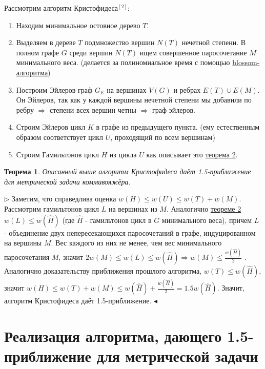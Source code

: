 \documentclass[A4, twocolumn]{article}
\newtheorem{Th}{Теорема}
\newenvironment{PROOF}
{\par\noindent{\bf Доказательство:}\newline$\triangleright$}
{\hfill$\scriptstyle\blacktriangleleft$}
\begin{document}
Рассмотрим алгоритм Кристофидеса\hyperref[algoChrist]{$^{[2]}$}:

\begin{enumerate}
	\item Находим минимальное остовное дерево $T$.
	\item Выделяем в дереве $T$ подмножество вершин $N(T)$ нечетной степени. В полном графе $G$ среди вершин $N(T)$ ищем совершенное паросочетание $M$ минимального веса. (делается за полиномиальное время с помощью \hyperref[kolm]{blossom-алгоритма})
	\item Построим Эйлеров граф $G_E$ на вершинах $V(G)$ и ребрах $E(T) \cup E(M)$. Он Эйлеров, так как у каждой вершины нечетной степени мы добавили по ребру $\Rightarrow$ степени всех вершин четны $\Rightarrow$ граф эйлеров.
	\item Строим Эйлеров цикл $K$ в графе из предыдущего пункта. (ему естественным образом соответствует цикл $U$, проходящий по всем вершинам)
	\item Строим Гамильтонов цикл $H$ из цикла $U$ как описывает это \hyperref[Th2]{теорема 2}.
\end{enumerate}

\begin{Th}
	Описанный выше алгоритм Кристофидеса даёт 1.5-приближение для метрической задачи коммивояжёра.	
\end{Th}

\begin{PROOF}
	Заметим, что справедлива оценка $w(H) \leq w(U) \leq w(T) + w(M)$. Рассмотрим гамильтонов цикл $L$ на вершинах из $M$. Аналогично \hyperref[Th2]{теореме 2} $w(L) \leq w(\hat{H})$ (где $\hat{H}$ - гамильтонов цикл в $G$ минимального веса), причем $L$ - объединение двух непересекающихся паросочетаний  в графе, индуцированном на вершины $M$. Вес каждого из них не менее, чем вес минимального паросочетания $M$, значит $2w(M) \leq w(L) \leq w(\hat{H}) \Rightarrow w(M) \leq \frac{w(\hat{H})}{2}$ . Аналогично доказательству приближения прошлого алгоритма, $w(T) \leq w(\hat{H})$, значит $w(H) \leq w(T) + w(M) \leq w(\hat{H}) + \frac{w(\hat{H})}{2} = 1.5w(\hat{H})$. Значит, алгоритм Кристофидеса даёт 1.5-приближение. 
\end{PROOF}




\section{\textbf{Реализация алгоритма, дающего 1.5-приближение для метрической задачи}}
\end{document}

